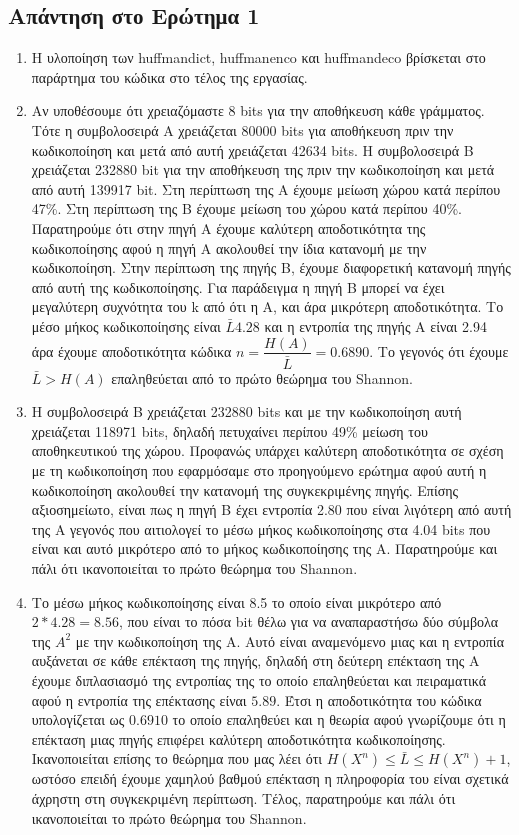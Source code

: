 \documentclass{article}
\begin{document}
\subsection*{Απάντηση στο Ερώτημα 1}
    \begin{enumerate}
        \item Η υλοποίηση των huffmandict, huffmanenco και huffmandeco βρίσκεται στο παράρτημα του κώδικα στο τέλος της εργασίας.
        \item Αν υποθέσουμε ότι χρειαζόμαστε 8 bits για την αποθήκευση κάθε γράμματος. Τότε η συμβολοσειρά Α χρειάζεται 80000 bits για αποθήκευση πριν την κωδικοποίηση και μετά από αυτή χρειάζεται 42634 bits. Η συμβολοσειρά Β χρειάζεται 232880 bit για την αποθήκευση της πριν την κωδικοποίηση και μετά από αυτή 139917 bit. Στη περίπτωση της Α έχουμε μείωση χώρου κατά περίπου 47\%. Στη περίπτωση της Β έχουμε μείωση του χώρου κατά περίπου 40\%. Παρατηρούμε ότι στην πηγή Α έχουμε καλύτερη αποδοτικότητα της κωδικοποίησης αφού η πηγή Α ακολουθεί την ίδια κατανομή με την κωδικοποίηση. Στην περίπτωση της πηγής Β, έχουμε διαφορετική κατανομή πηγής από αυτή της κωδικοποίησης. Για παράδειγμα η πηγή Β μπορεί να έχει μεγαλύτερη συχνότητα του k από ότι η Α, και άρα μικρότερη αποδοτικότητα. Το μέσο μήκος κωδικοποίησης είναι $\bar{L}4.28$ και η εντροπία της πηγής Α είναι 2.94 άρα έχουμε αποδοτικότητα κώδικα $n = \dfrac{H(A)}{\bar{L}} = 0.6890$. Το γεγονός ότι έχουμε $\bar{L}>H(A)$ επαληθεύεται από το πρώτο θεώρημα του Shannon.
        \item Η συμβολοσειρά Β χρειάζεται 232880 bits και με την κωδικοποίηση αυτή χρειάζεται 118971 bits, δηλαδή πετυχαίνει περίπου 49\% μείωση του αποθηκευτικού της χώρου. Προφανώς υπάρχει καλύτερη αποδοτικότητα σε σχέση με τη κωδικοποίηση που εφαρμόσαμε στο προηγούμενο ερώτημα αφού αυτή η κωδικοποίηση ακολουθεί την κατανομή της συγκεκριμένης πηγής. Επίσης αξιοσημείωτο, είναι πως η πηγή Β έχει εντροπία 2.80 που είναι λιγότερη από αυτή της Α γεγονός που αιτιολογεί το μέσω μήκος κωδικοποίησης στα 4.04 bits που είναι και αυτό μικρότερο από το μήκος κωδικοποίησης της Α. Παρατηρούμε και πάλι ότι ικανοποιείται το πρώτο θεώρημα του Shannon.
        \item Το μέσω μήκος κωδικοποίησης είναι 8.5 το οποίο είναι μικρότερο από $2 * 4.28 = 8.56$, που είναι το πόσα bit θέλω για να αναπαραστήσω δύο σύμβολα της $A^2$ με την κωδικοποίηση της Α. Αυτό είναι αναμενόμενο μιας και η εντροπία αυξάνεται σε κάθε επέκταση της πηγής, δηλαδή στη δεύτερη επέκταση της Α έχουμε διπλασιασμό της εντροπίας της το οποίο επαληθεύεται και πειραματικά αφού η εντροπία της επέκτασης είναι $5.89$. Έτσι η αποδοτικότητα του κώδικα υπολογίζεται ως $0.6910$ το οποίο επαληθεύει και η θεωρία αφού γνωρίζουμε ότι η επέκταση μιας πηγής επιφέρει καλύτερη αποδοτικότητα κωδικοποίησης. Ικανοποιείται επίσης το θεώρημα που μας λέει ότι $H(X^n) \le \bar{L} \le H(X^n)+1$, ωστόσο επειδή έχουμε χαμηλού βαθμού επέκταση η πληροφορία του είναι σχετικά άχρηστη στη συγκεκριμένη περίπτωση. Τέλος, παρατηρούμε και πάλι ότι ικανοποιείται το πρώτο θεώρημα του Shannon.

\end{enumerate}
\end{document}
